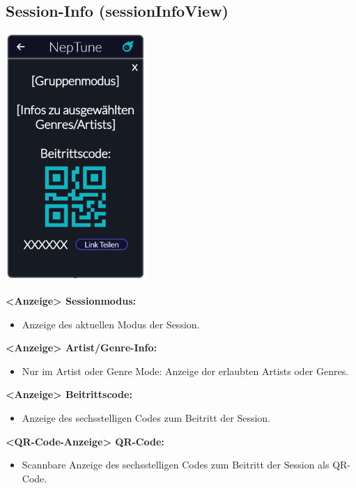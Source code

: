 \documentclass[oneside, ngerman]{sdqtechreport}
\begin{document}
\subsection{Session-Info (sessionInfoView)}
\label{sec:Benutzeroberfläche:sessionInfoView}

\begin{center}
    \hypertarget{sessionInfoView}{}
    \includegraphics[width=0.4\textwidth]{LATEX/Pflichtenheft/GraphicDesigns/shareLinkPopUpPage.png}
\end{center}

\textbf{<Anzeige> Sessionmodus:}
\begin{itemize}
    \item Anzeige des aktuellen Modus der Session.
\end{itemize}

\textbf{<Anzeige> Artist/Genre-Info:}
\begin{itemize}
    \item Nur im Artist oder Genre Mode: Anzeige der erlaubten Artists oder Genres.
\end{itemize}

\textbf{<Anzeige> Beitrittscode:}
\begin{itemize}
    \item Anzeige des sechsstelligen Codes zum Beitritt der Session.
\end{itemize}

\textbf{<QR-Code-Anzeige> QR-Code:}
\begin{itemize}
    \item Scannbare Anzeige des sechsstelligen Codes zum Beitritt der Session als QR-Code.
\end{itemize}
\end{document}
